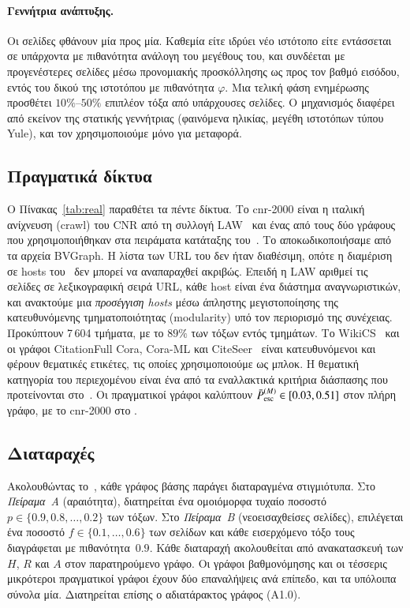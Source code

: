 \documentclass[11pt,a4paper]{article}
\theoremstyle{definition}
\theoremstyle{remark}
\newcommand{\Pbar}{\bar P^{(M)}_{\mathrm{esc}}}
\begin{document}
\paragraph{Γεννήτρια ανάπτυξης.} Οι σελίδες φθάνουν μία προς μία. Καθεμία είτε ιδρύει νέο ιστότοπο είτε
εντάσσεται σε υπάρχοντα με πιθανότητα ανάλογη του μεγέθους του, και συνδέεται με προγενέστερες σελίδες
μέσω προνομιακής προσκόλλησης ως προς τον βαθμό εισόδου, εντός του δικού της ιστοτόπου με πιθανότητα
$\varphi$. Μια τελική φάση ενημέρωσης προσθέτει $10\%$--$50\%$ επιπλέον τόξα από υπάρχουσες σελίδες. Ο
μηχανισμός διαφέρει από εκείνον της στατικής γεννήτριας (φαινόμενα ηλικίας, μεγέθη ιστοτόπων τύπου
Yule), και τον χρησιμοποιούμε μόνο για μεταφορά.

\subsection{Πραγματικά δίκτυα}
Ο Πίνακας~\ref{tab:real} παραθέτει τα πέντε δίκτυα. Το cnr-2000 είναι η ιταλική ανίχνευση (crawl) του
CNR από τη συλλογή LAW~\cite{boldi04,boldi04ubi} και ένας από τους δύο γράφους που χρησιμοποιήθηκαν στα
πειράματα κατάταξης του~\cite{ng13}. Το αποκωδικοποιήσαμε από τα αρχεία BVGraph. Η λίστα των URL του
δεν ήταν διαθέσιμη, οπότε η διαμέριση σε hosts του~\cite{ng13} δεν μπορεί να αναπαραχθεί ακριβώς.
Επειδή η LAW αριθμεί τις σελίδες σε λεξικογραφική σειρά URL, κάθε host είναι ένα διάστημα
αναγνωριστικών, και ανακτούμε μια \emph{προσέγγιση hosts} μέσω άπληστης μεγιστοποίησης της
κατευθυνόμενης τμηματοποιότητας (modularity) υπό τον περιορισμό της συνέχειας. Προκύπτουν 7\,604
τμήματα, με το $89\%$ των τόξων εντός τμημάτων. Το WikiCS~\cite{mernyei20} και οι γράφοι CitationFull
Cora, Cora-ML και CiteSeer~\cite{bojchevski18} είναι κατευθυνόμενοι και φέρουν θεματικές ετικέτες, τις
οποίες χρησιμοποιούμε ως μπλοκ. Η θεματική κατηγορία του περιεχομένου είναι ένα από τα εναλλακτικά
κριτήρια διάσπασης που προτείνονται στο~\cite[§5]{ng13}. Οι πραγματικοί γράφοι καλύπτουν
$\Pbar\in[\PbarRealMin,\PbarRealMax]$ στον πλήρη γράφο, με το cnr-2000 στο \PbarCnr.



\subsection{Διαταραχές}
\label{sec:perturb}
Ακολουθώντας το~\cite[§4.2]{ng13}, κάθε γράφος βάσης παράγει διαταραγμένα στιγμιότυπα. Στο
\emph{Πείραμα~Α} (αραιότητα), διατηρείται ένα ομοιόμορφα τυχαίο ποσοστό
$p\in\{0.9,0.8,\dots,0.2\}$ των τόξων. Στο \emph{Πείραμα~Β} (νεοεισαχθείσες σελίδες), επιλέγεται ένα
ποσοστό $f\in\{0.1,\dots,0.6\}$ των σελίδων και κάθε εισερχόμενο τόξο τους διαγράφεται με
πιθανότητα~$0.9$. Κάθε διαταραχή ακολουθείται από ανακατασκευή των $H$, $R$ και $A$ στον παρατηρούμενο
γράφο. Οι γράφοι βαθμονόμησης και οι τέσσερις μικρότεροι πραγματικοί γράφοι έχουν δύο επαναλήψεις ανά
επίπεδο, και τα υπόλοιπα σύνολα μία. Διατηρείται επίσης ο αδιατάρακτος γράφος (A1.0).
\end{document}

